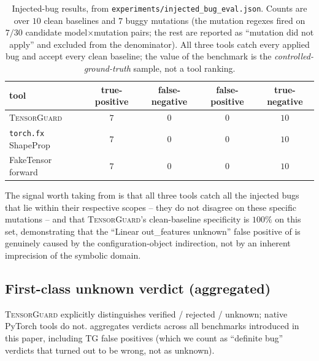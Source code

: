 \documentclass{article}
\theoremstyle{definition}
\begin{document}
\begin{table}[t]
\centering\small
\caption{Injected-bug results, from
\texttt{experiments/injected\_bug\_eval.json}. Counts are over
$10$ clean baselines and $7$ buggy mutations (the mutation regexes
fired on $7/30$ candidate model$\times$mutation pairs; the rest
are reported as ``mutation did not apply'' and excluded from the
denominator). All three tools catch every applied bug and accept
every clean baseline; the value of the benchmark is the
\emph{controlled-ground-truth} sample, not a tool ranking.}
\label{tab:injected-bug}
\begin{tabular}{lcccc}
\toprule
tool & true-positive & false-negative & false-positive & true-negative \\
\midrule
\textsc{TensorGuard}      & $7$ & $0$ & $0$ & $10$ \\
\verb|torch.fx| ShapeProp & $7$ & $0$ & $0$ & $10$ \\
FakeTensor forward        & $7$ & $0$ & $0$ & $10$ \\
\bottomrule
\end{tabular}
\end{table}

The signal worth taking from  is that all
three tools catch all the injected bugs that lie within their
respective scopes -- they do not disagree on these specific
mutations -- and that \textsc{TensorGuard}'s clean-baseline
specificity is $100\%$ on this set, demonstrating that the
``Linear out\_features unknown'' false positive of
 is genuinely caused by the configuration-object
indirection, not by an inherent imprecision of the symbolic
domain.

\subsection{First-class \textsf{unknown} verdict (aggregated)}
\label{sec:unknown-verdict}

\textsc{TensorGuard} explicitly distinguishes
\textsf{verified} / \textsf{rejected} / \textsf{unknown}; native
PyTorch tools do not.  aggregates verdicts
across all benchmarks introduced in this paper, including TG false
positives (which we count as ``definite bug'' verdicts that turned
out to be wrong, not as \textsf{unknown}).
\end{document}
